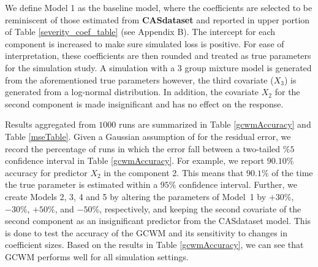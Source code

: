 \documentclass[12pt,letterpaper]{article}
\numberwithin{equation}{section}
\numberwithin{equation}{section}
\numberwithin{equation}{section}
\begin{document}
We define Model 1 as the baseline model, where the coefficients are selected to be reminiscent of those estimated from \textbf{CASdataset} and reported in upper portion of Table \ref{severity_coef_table} (see Appendix B). The intercept for each component is increased to make sure simulated loss is positive. For ease of interpretation, these coefficients are then rounded and treated as true parameters for the simulation study.  A simulation with a 3 group mixture model is generated from the aforementioned true parameters however, the third covariate ($X_3$) is generated from a log-normal distribution.  In addition, the covariate $X_2$ for the second component is made insignificant and has no effect on the response. 


Results aggregated from $1000$ runs are summarized in Table \ref{gcwmAccuracy} and Table \ref{mseTable}. Given a Gaussian assumption of for the residual error, we record the percentage of runs in which the error fall between a two-tailed $\% 5$ confidence interval in Table \ref{gcwmAccuracy}. For example, we report $90.10\%$ accuracy for predictor $X_2$ in the component 2. This means that $90.1\%$ of the time the true parameter is estimated within a $95\%$ confidence interval. 
Further, we create Models 2, 3, 4 and 5 by altering the parameters of Model~1 by $+30\%$, $-30\%$, $+50\%$, and $-50\%$, respectively, and keeping the second covariate of the second component as an insignificant predictor from the CASdataset model. This is done to test the accuracy of the GCWM and its sensitivity to changes in coefficient sizes. Based on the results in Table \ref{gcwmAccuracy}, we can see that GCWM performs well for all simulation settings.
\end{document}
